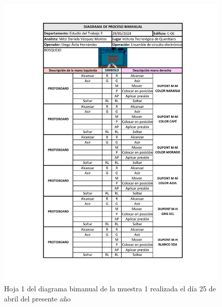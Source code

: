     \begin{figure}[H]
        \centering
        \includegraphics[trim = {1mm 1mm 1mm 1mm},clip,scale=0.45]{34/img/diagramaBimanual1.pdf}
        \caption{Hoja 1 del diagrama bimanual de la muestra 1 realizada el día 25 de abril del presente año}
        \label{fig:diagramaBimanual1}
    \end{figure}
    
